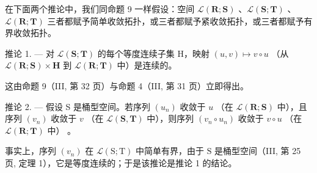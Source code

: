 在下面两个推论中，我们同命题 9 一样假设：空间 \(\mathcal{L}(\mathbf{R};\mathbf{S})\) 、\(\mathcal{L}(\mathbf{S};\mathbf{T})\) 、\(\mathcal{L}(\mathbf{R};\mathbf{T})\) 三者都赋予简单收敛拓扑，或三者都赋予紧收敛拓扑，或三者都赋予有界收敛拓扑。

推论 1. --- 对 \(\mathcal{L}(\mathbf{S};\mathbf{T})\) 的每个等度连续子集 H，映射 \((u,v)\mapsto v\circ u\) （从 \(\mathcal{L}(\mathbf{R};\mathbf{S})\times \mathbf{H}\) 到 \(\mathcal{L}(\mathbf{R};\mathbf{T})\) 中）是连续的。

这由命题 9（III, 第 32 页）与命题 4（III, 第 31 页）立即得出。

推论 2. --- 假设 S 是桶型空间。若序列 \((u_n)\) 收敛于 \(u\) （在 \(\mathcal{L}(\mathbf{R};\mathbf{S})\) 中），且序列 \((v_{n})\) 收敛于 \(v\) （在 \(\mathcal{L}(\mathbf{S},\mathbf{T})\) 中），则序列 \((v_{n}\circ u_{n})\) 收敛于 \(v\circ u\) （在 \(\mathcal{L}(\mathbf{R};\mathbf{T})\) 中） 。

事实上，序列 \((v_{n})\) 在 \(\mathcal{L}(\mathrm{S};\mathrm{T})\) 中简单有界，由于 \(\mathrm{S}\) 是桶型空间（III, 第 25 页, 定理 1），它是等度连续的；于是该推论是推论 1 的结论。


